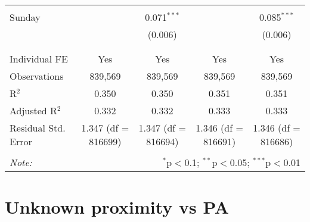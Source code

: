 \documentclass[
]{article}
\begin{document}
\begin{table}[!htbp]
{\begin{tabular}{@{\extracolsep{5pt}}lcccc}
  & & & & \\ 
 Sunday &  & 0.071$^{***}$ &  & 0.085$^{***}$ \\ 
  &  & (0.006) &  & (0.006) \\ 
  & & & & \\ 
\hline \\[-1.8ex] 
Individual FE & Yes & Yes & Yes & Yes \\ 
Observations & 839,569 & 839,569 & 839,569 & 839,569 \\ 
R$^{2}$ & 0.350 & 0.350 & 0.351 & 0.351 \\ 
Adjusted R$^{2}$ & 0.332 & 0.332 & 0.333 & 0.333 \\ 
Residual Std. Error & 1.347 (df = 816699) & 1.347 (df = 816694) & 1.346 (df = 816691) & 1.346 (df = 816686) \\ 
\hline 
\hline \\[-1.8ex] 
\textit{Note:}  & \multicolumn{4}{r}{$^{*}$p$<$0.1; $^{**}$p$<$0.05; $^{***}$p$<$0.01} \\ 
\end{tabular}
} 
\end{table} 
\newpage
\section{Unknown proximity vs PA}
\end{document}
